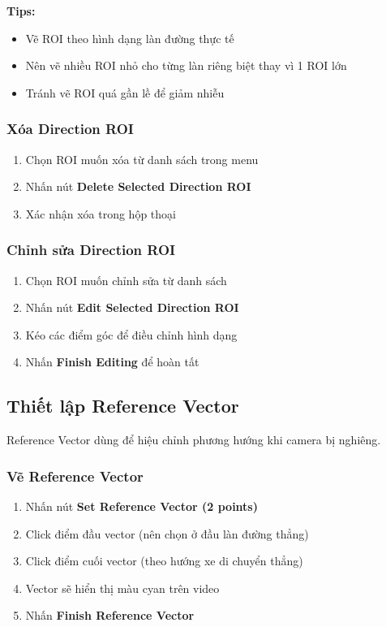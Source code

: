 \textbf{Tips:}
\begin{itemize}
    \item Vẽ ROI theo hình dạng làn đường thực tế
    \item Nên vẽ nhiều ROI nhỏ cho từng làn riêng biệt thay vì 1 ROI lớn
    \item Tránh vẽ ROI quá gần lề để giảm nhiễu
\end{itemize}

\subsubsection{Xóa Direction ROI}
\begin{enumerate}
    \item Chọn ROI muốn xóa từ danh sách trong menu
    \item Nhấn nút \textbf{Delete Selected Direction ROI}
    \item Xác nhận xóa trong hộp thoại
\end{enumerate}

\subsubsection{Chỉnh sửa Direction ROI}
\begin{enumerate}
    \item Chọn ROI muốn chỉnh sửa từ danh sách
    \item Nhấn nút \textbf{Edit Selected Direction ROI}
    \item Kéo các điểm góc để điều chỉnh hình dạng
    \item Nhấn \textbf{Finish Editing} để hoàn tất
\end{enumerate}

\subsection{Thiết lập Reference Vector}

Reference Vector dùng để hiệu chỉnh phương hướng khi camera bị nghiêng.

\subsubsection{Vẽ Reference Vector}
\begin{enumerate}
    \item Nhấn nút \textbf{Set Reference Vector (2 points)}
    \item Click điểm đầu vector (nên chọn ở đầu làn đường thẳng)
    \item Click điểm cuối vector (theo hướng xe di chuyển thẳng)
    \item Vector sẽ hiển thị màu cyan trên video
    \item Nhấn \textbf{Finish Reference Vector}
\end{enumerate}

